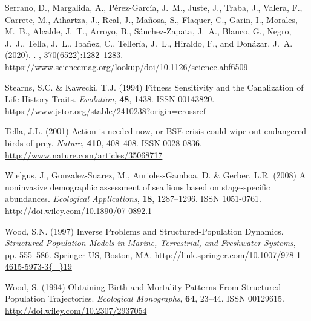 \documentclass[12pt]{article}
\begin{document}
\begin{thebibliography}{87}
	Serrano, D., Margalida, A., P{\'{e}}rez-Garc{\'{i}}a, J.~M., Juste, J., Traba,
	J., Valera, F., Carrete, M., Aihartza, J., Real, J., Ma{\~{n}}osa, S.,
	Flaquer, C., Garin, I., Morales, M.~B., Alcalde, J.~T., Arroyo, B.,
	S{\'{a}}nchez-Zapata, J.~A., Blanco, G., Negro, J.~J., Tella, J.~L.,
	Iba{\~{n}}ez, C., Teller{\'{i}}a, J.~L., Hiraldo, F., and Don{\'{a}}zar,
	J.~A. (2020).
	.
	, 370(6522):1282--1283.
	\newline\urlprefix\url{https://www.sciencemag.org/lookup/doi/10.1126/science.abf6509}
	
	Stearns, S.C. \& Kawecki, T.J. (1994) {Fitness Sensitivity and the Canalization
		of Life-History Traits}.
	\newblock \emph{Evolution}, \textbf{48}, 1438.
	\newblock ISSN 00143820.
	\newline\urlprefix\url{https://www.jstor.org/stable/2410238?origin=crossref}
	
	Tella, J.L. (2001) {Action is needed now, or BSE crisis could wipe out
		endangered birds of prey}.
	\newblock \emph{Nature}, \textbf{410}, 408--408.
	\newblock ISSN 0028-0836.
	\newline\urlprefix\url{http://www.nature.com/articles/35068717}
	
	Wielgus, J., Gonzalez-Suarez, M., Aurioles-Gamboa, D. \& Gerber, L.R. (2008) {A
		noninvasive demographic assessment of sea lions based on stage-specific
		abundances}.
	\newblock \emph{Ecological Applications}, \textbf{18}, 1287--1296.
	\newblock ISSN 1051-0761.
	\newline\urlprefix\url{http://doi.wiley.com/10.1890/07-0892.1}
	
	Wood, S.N. (1997) {Inverse Problems and Structured-Population Dynamics}.
	\newblock  \emph{Structured-Population Models in Marine, Terrestrial, and
		Freshwater Systems}, pp. 555--586. Springer US, Boston, MA.
	\newline\urlprefix\url{http://link.springer.com/10.1007/978-1-4615-5973-3{\_}19}
	
	Wood, S. (1994) {Obtaining Birth and Mortality Patterns From Structured
		Population Trajectories}.
	\newblock \emph{Ecological Monographs}, \textbf{64}, 23--44.
	\newblock ISSN 00129615.
	\newline\urlprefix\url{http://doi.wiley.com/10.2307/2937054}
	

\end{thebibliography}
\end{document}
